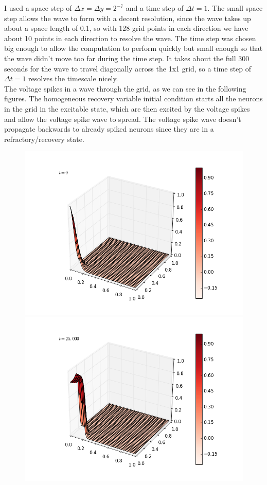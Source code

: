 \documentclass[12pt]{article}
\begin{document}
\begin{enumerate}[(a)]
I used a space step of $\Delta x = \Delta y = 2^{-7}$ and a time step of $\Delta t = 1$.  The small space step allows the wave to form with a decent resolution, since the wave takes up about a space length of 0.1, so with 128 grid points in each direction we have about 10 points in each direction to resolve the wave.   The time step was chosen big enough to allow the computation to perform quickly but small enough so that the wave didn't move too far during the time step.  It takes about the full 300 seconds for the wave to travel diagonally across the 1x1 grid, so a time step of $\Delta t=1$ resolves the timescale nicely.\\
The voltage spikes in a wave through the grid, as we can see in the following figures.  The homogeneous recovery variable initial condition starts all the neurons in the grid in the excitable state, which are then excited by the voltage spikes and allow the voltage spike wave to spread.  The voltage spike wave doesn't propagate backwards to already spiked neurons since they are in a refractory/recovery state.
\begin{figure}[H]
\includegraphics[scale=0.4]{partb_fast_frames/partb_fast_fig01.png}%
\includegraphics[scale=0.4]{partb_fast_frames/partb_fast_fig03.png}

\end{figure}
\end{enumerate}
\end{document}
